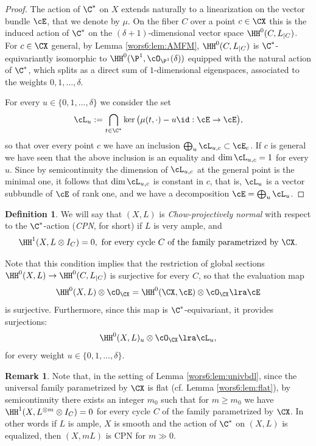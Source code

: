\documentclass[reqno]{amsproc}
\theoremstyle{definition}
\newtheorem{definition}[theorem]{Definition}
\newtheorem{remark}[theorem]{Remark}
\begin{document}
\begin{proof}
The action of $\C^*$ on $X$ extends naturally to a linearization on the vector bundle $\cE$, that we denote by $\mu$. On the fiber $C$ over a point $c\in \CX$ this is the induced action of $\C^*$ on the $(\delta+1)$-dimensional vector space $\HH^0(C,L_{|C})$. For $c\in\CX$ general,  by Lemma \ref{wors6:lem:AMFM}, $\HH^0(C,L_{|C})$ is $\C^*$-equivariantly isomorphic to $\HH^0(\P^1,\cO_{\P^1}(\delta))$ equipped with the natural action of $\C^*$, which splits as a direct sum of $1$-dimensional eigenspaces, associated to the weights $0,1,\dots,\delta$. 

For every $u\in\{0,1,\dots,\delta\}$ we consider the set $$\cL_u:=\bigcap_{t\in \C^*}\ker\big(\mu(t,\cdot)-u\id:\cE\to \cE\big),$$ 
so that over every point $c$ we have an inclusion $\bigoplus_{u}\cL_{u,c}\subset \cE_c$. If $c$ is general we have seen that the above inclusion is an equality and $\dim\cL_{u,c}=1$ for every $u$. Since by semicontinuity the dimension of $\cL_{u,c}$ at the general point is the minimal one, it follows that $\dim\cL_{u,c}$ is constant in $c$, that is, $\cL_u$ is a vector subbundle of $\cE$ of rank one, and we have a decomposition $\cE=\bigoplus_u\cL_u$. 
\end{proof}

\begin{definition}\label{wors6:def:noH1}
We will say that $(X,L)$ is {\em Chow-projectively normal} with respect to the  $\C^*$-action ({\em CPN}, for short) if $L$ is very ample, and
$$
\HH^1(X,L\otimes I_C)=0,\,\,\mbox{for every cycle $C$ of the family parametrized by $\CX$}.
$$
\end{definition}

Note that this condition implies that the restriction of global sections $\HH^0(X,L)\to\HH^0(C,L_{|C})$ is surjective for every $C$, so that the evaluation map 
$$\HH^0(X,L)\otimes \cO_{\CX}=\HH^0(\CX,\cE)\otimes \cO_{\CX}\lra\cE$$
is surjective. Furthermore, since this map is $\C^*$-equivariant, it provides surjections:
\begin{equation}\label{wors6:eq:surjec}
\HH^0(X,L)_u\otimes \cO_{\CX}\lra\cL_u,
\end{equation}
for every weight $u\in\{0,1,\dots,\delta\}$. 

\begin{remark}\label{wors6:rem:ratnormal0}
Note that, in the setting of Lemma \ref{wors6:lem:univbdl}, since the universal family parametrized by $\CX$ is flat 
(cf.  Lemma \ref{wors6:lem:flat}), by semicontinuity 
there exists an integer $m_0$ such that for $m\geq m_0$ we have $\HH^1(X,L^{\otimes m}\otimes I_C)=0$ for every cycle $C$ of the family parametrized by $\CX$.  
In other words if $L$ is ample, $X$ is smooth and the action of $\C^*$ on $(X,L)$ is equalized, then $(X,mL)$ is CPN for $m\gg 0$. 
\end{remark}
\end{document}
